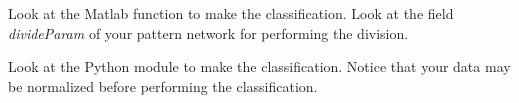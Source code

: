 \begin{mcomment}
\begin{mremark}
Look at the Matlab function  to make the classification.  Look at the field \textsl{divideParam} of your pattern network for performing the division.
\end{mremark}
\end{mcomment}

\begin{pcomment}
\begin{premark}
Look at the Python module  to make the classification. Notice that your data may be normalized before performing the classification.
\end{premark}
\end{pcomment}

